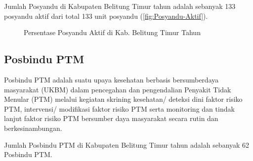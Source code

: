 Jumlah Posyandu di Kabupaten Belitung Timur tahun \tP adalah sebanyak 133 posyandu aktif dari total 133 unit posyandu (\autoref{fig:Posyandu-Aktif}).

\begin{figure}[H]
	\centering{}
	\caption{Persentase Posyandu Aktif di Kab. Belitung Timur Tahun \tP}
	\label{fig:Posyandu-Aktif}
\end{figure}

\subsection{Posbindu PTM}
Posbindu PTM adalah suatu upaya kesehatan berbasis bersumberdaya masyarakat (UKBM) dalam pencegahan dan pengendalian Penyakit Tidak Menular (PTM) melalui kegiatan skrining kesehatan/ deteksi dini faktor risiko PTM, intervensi/ modifikasi faktor risiko PTM serta monitoring dan tindak lanjut faktor risiko PTM bersumber daya masyarakat secara rutin dan berkesinambungan.

Jumlah Posbindu PTM di Kabupaten Belitung Timur tahun \tP adalah sebanyak 62 Posbindu PTM. %
